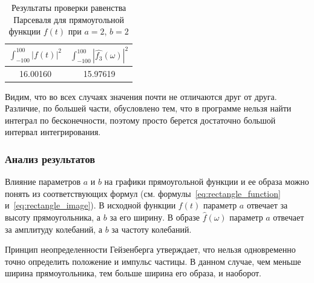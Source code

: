 \begin{table}[ht!]
    \centering
    \begin{tabular}{|c|c|}
        \hline
        $\displaystyle\int_{-100}^{100}{|f(t)|^2}$ & $\displaystyle\int_{-100}^{100}{|\hat{f_3}(\omega)|^2}$ \\
        \hline
        16.00160 & 15.97619 \\
        \hline
    \end{tabular}
    \caption{Результаты проверки равенства Парсеваля для прямоугольной функции $f(t)$ при $a = 2$, $b = 2$}
    \label{tab:rectangle_3_parseval_check}
\end{table}

Видим, что во всех случаях значения почти не отличаются друг от друга. Различие, по большей части, обусловлено тем, что в программе нельзя найти интеграл по бесконечности, поэтому просто берется достаточно большой интервал интегрирования.

\subsubsection{Анализ результатов}
Влияние параметров $a$ и $b$ на графики прямоугольной функции и ее образа можно понять из соответствующих формул (см. формулы~\eqref{eq:rectangle_function} и~\eqref{eq:rectangle_image}).
В исходной функции $f(t)$ параметр $a$ отвечает за высоту прямоугольника, а $b$ за его ширину.
В образе $\hat{f}(\omega)$ параметр $a$ отвечает за амплитуду колебаний, а $b$ за частоту колебаний.

Принцип неопределенности Гейзенберга утверждает, что нельзя одновременно точно определить положение и импульс частицы. В данном случае, чем меньше ширина прямоугольника, тем больше ширина его образа, и наоборот. 

